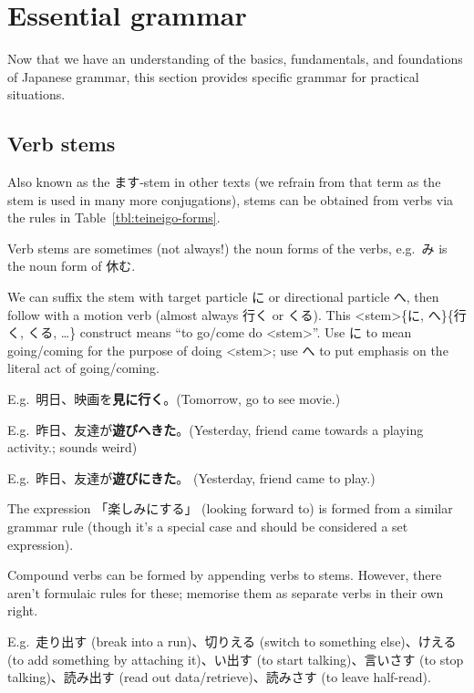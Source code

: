 \documentclass[../nihongo-gakushuu-kyouzai.tex]{subfiles}
\begin{document}
\onehalfspacing  %

\setcounter{section}{2}
\section{Essential grammar} \label{sec:essential-grammar}

Now that we have an understanding of the basics, fundamentals, and foundations of Japanese grammar, this section provides specific grammar for practical situations.

\subsection{Verb stems}

Also known as the ます-stem in other texts (we refrain from that term as the stem is used in many more conjugations), stems can be obtained from verbs via the rules in Table~\ref{tbl:teineigo-forms}.

Verb stems are sometimes (not always!) the noun forms of the verbs, e.g.\ み is the noun form of 休む.

We can suffix the stem with target particle に or directional particle へ, then follow with a motion verb (almost always 行く or くる). This <stem>\{に, へ\}\{行く, くる, \dots\} construct means ``to go/come do <stem>''. Use に to mean going/coming for the purpose of doing <stem>; use へ to put emphasis on the literal act of going/coming.

E.g.\ 明日、映画を\textbf{見に行く}。(Tomorrow, go to see movie.)

E.g.\ 昨日、友達が\textbf{遊びへきた}。(Yesterday, friend came towards a playing activity.; sounds weird)

E.g.\ 昨日、友達が\textbf{遊びにきた}。 (Yesterday, friend came to play.)

The expression 「楽しみにする」 (looking forward to) is formed from a similar grammar rule (though it's a special case and should be considered a set expression).

Compound verbs can be formed by appending verbs to stems. However, there aren't formulaic rules for these; memorise them as separate verbs in their own right.

E.g.\ 走り出す (break into a run)、切りえる (switch to something else)、けえる (to add something by attaching it)、い出す (to start talking)、言いさす (to stop talking)、読み出す (read out data/retrieve)、読みさす (to leave half-read).
\end{document}
